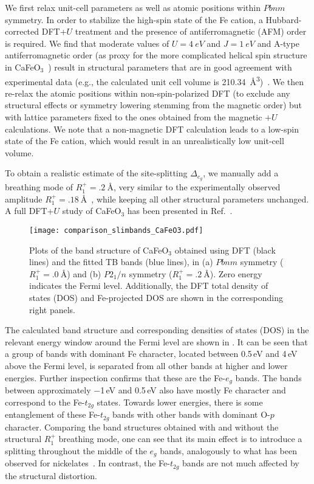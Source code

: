 \documentclass[aps,prb,twocolumn,superscriptaddress,10pt]{revtex4-1}
\newcommand{\pref}[1]{\prettyref{#1}}%
\newcommand{\BM}{\ensuremath{{R_1^+}}\xspace}
\newcommand{\eg}{\ensuremath{{e_g}}\xspace}
\newcommand{\ttg}{\ensuremath{{t_{2g}}}\xspace}
\newcommand{\CFO}{CaFeO$_3$\xspace}
\newcommand{\Pton}{\ensuremath{P2_1/n}\xspace}
\begin{document}
We first relax unit-cell parameters as well as atomic positions within $Pbnm$ symmetry. In order to stabilize the high-spin state of the Fe cation, a Hubbard-corrected DFT+$U$ treatment and the presence of antiferromagnetic (AFM) order is required.
We find that moderate values of $U=\SI{4}{eV}$ and $J=\SI{1}{eV}$ and A-type antiferromagnetic order (as proxy for the more complicated helical spin structure in \CFO~\cite{rogge_itinerancy-dependent_2019}) result in structural parameters that are in good agreement with experimental data (e.g., the calculated unit cell volume is \SI{210.34}{\angstrom\cubed})~\cite{morimoto_structure_1996, woodward_structural_2000}.  
We then re-relax the atomic positions within non-spin-polarized DFT (to exclude any structural effects or symmetry lowering stemming from the magnetic order) but with lattice parameters fixed to the ones obtained from the magnetic $+U$ calculations. 
We note that a non-magnetic DFT calculation leads to a low-spin state of the Fe cation, which would result in an unrealistically low unit-cell volume.

To obtain a realistic estimate of the site-splitting $\Delta_{e_g}$, we manually add a breathing mode of $\BM = \SI{.2}{\angstrom}$, very similar to the experimentally observed amplitude $\BM = \SI{.18}{\angstrom}$~\cite{woodward_structural_2000}, while keeping all other structural parameters unchanged.
A full DFT+$U$ study of CaFeO$_3$ has been presented in Ref.~. 

\begin{figure}
    \centering
    \texttt{[image: comparison\_slimbands\_CaFeO3.pdf]}
    \caption{Plots of the band structure of \CFO obtained using DFT (black lines) and the fitted TB bands (blue lines), in (a) $Pbnm$ symmetry ($\BM = \SI{.0}{\angstrom}$) and (b) \Pton symmetry ($\BM = \SI{.2}{\angstrom}$). Zero energy indicates the Fermi level.
    Additionally, the DFT total density of states (DOS) and Fe-projected DOS are shown in the corresponding right panels.}
    \label{fig:bands_dft_tb}
\end{figure}

The calculated band structure and corresponding densities of states (DOS) in the relevant energy window around the Fermi level are shown in \pref{fig:bands_dft_tb}. It can be seen that a group of bands with dominant Fe character, located between 0.5\,eV and 4\,eV above the Fermi level, is separated from all other bands at higher and lower energies. Further inspection confirms that these are the Fe-\eg bands. The bands between approximately $-$1\,eV and 0.5\,eV also have mostly Fe character and correspond to the Fe-\ttg states. Towards lower energies, there is some entanglement of these Fe-\ttg bands with other bands with dominant O-$p$ character.
%
Comparing the band structures obtained with and without the structural $R_1^+$ breathing mode, one can see that its main effect is to introduce a splitting throughout the middle of the \eg bands, analogously to what has been observed for nickelates~\cite{subedi_low-energy_2015, mercy_structurally_2017}. In contrast, the Fe-\ttg bands are not much affected by the structural distortion.
\end{document}
